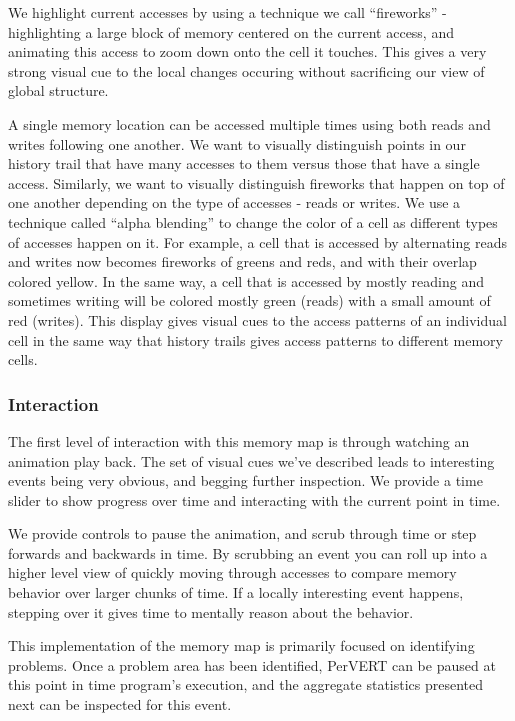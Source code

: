 \documentclass[annual]{acmsiggraph}
\begin{document}
  
  We highlight current accesses by using a technique we call ``fireworks'' - highlighting a large block of memory centered on the current access, and animating this access to zoom down onto the cell it touches. This gives a very strong visual cue to the local changes occuring without sacrificing our view of global structure.
  
  A single memory location can be accessed multiple times using both reads and writes following one another. We want to visually distinguish points in our history trail that have many accesses to them versus those that have a single access. Similarly, we want to visually distinguish fireworks that happen on top of one another depending on the type of accesses - reads or writes. We use a technique called ``alpha blending'' to change the color of a cell as different types of accesses happen on it. For example, a cell that is accessed by alternating reads and writes now becomes fireworks of greens and reds, and with their overlap colored yellow. In the same way, a cell that is accessed by mostly reading and sometimes writing will be colored mostly green (reads) with a small amount of red (writes). This display gives visual cues to the access patterns of an individual cell in the same way that history trails gives access patterns to different memory cells.
  
  \subsubsection{Interaction}
    The first level of interaction with this memory map is through watching an animation play back. The set of visual cues we've described leads to interesting events being very obvious, and begging further inspection. We provide a time slider to show progress over time and interacting with the current point in time.
    
    We provide controls to pause the animation, and scrub through time or step forwards and backwards in time. By scrubbing an event you can roll up into a higher level view of quickly moving through accesses to compare memory behavior over larger chunks of time. If a locally interesting event happens, stepping over it gives time to mentally reason about the behavior.
    
    This implementation of the memory map is primarily focused on identifying problems. Once a problem area has been identified, PerVERT can be paused at this point in time program's execution, and the aggregate statistics presented next can be inspected for this event.
  
\end{document}
